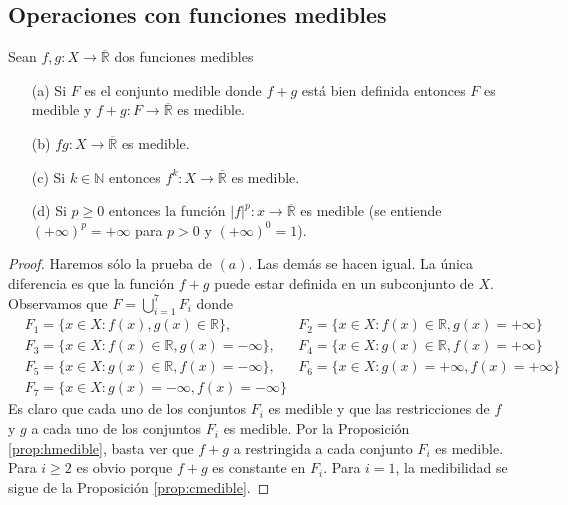 \subsection{Operaciones con funciones medibles}

\begin{prop}
    \label{prop:fmedibles}
    Sean $f,g: X \longrightarrow \overline{\mathbb{R}}$ dos funciones medibles
    \begin{enumerate}
        \item[(a)] Si $F$ es el conjunto medible donde $f+g$ está bien definida entonces $F$ es medible y $f+g: F \longrightarrow \overline{\mathbb{R}}$ es medible.
        \item[(b)] $fg: X \longrightarrow \overline{\mathbb{R}}$ es medible.
        \item[(c)] Si $k \in \mathbb{N}$ entonces $f^k: X \longrightarrow \overline{\mathbb{R}}$ es medible.
        \item[(d)] Si $p \ge 0$ entonces la función $|f|^p: x \longrightarrow \overline{\mathbb{R}}$ es medible (se entiende $(+\infty)^p = +\infty$ para $p > 0$ y $(+\infty)^0 = 1$).
    \end{enumerate}
\end{prop}

\begin{proof}
    Haremos sólo la prueba de $(a)$. Las demás se hacen igual. La única diferencia es que la función $f+g$ puede estar definida en un subconjunto de $X$. Observamos que $F = \bigcup_{i=1}^{7}{F_i}$ donde
    \begin{align*}
         & F_1 = \{ x \in X : f(x),g(x) \in \mathbb{R} \},          & F_2 = \{x \in X :f(x) \in \mathbb{R}, g(x) = +\infty \} \\
         & F_3 = \{x \in X :f(x) \in \mathbb{R}, g(x) = -\infty \}, & F_4 = \{x \in X :g(x) \in \mathbb{R}, f(x) = +\infty \} \\
         & F_5 = \{x \in X :g(x) \in \mathbb{R}, f(x) = -\infty \}, & F_6 = \{x \in X :g(x) = +\infty , f(x) = +\infty \}     \\
         & F_7 = \{x \in X :g(x) = -\infty , f(x) = -\infty \}
    \end{align*}
    Es claro que cada uno de los conjuntos $F_i$ es medible y que las restricciones de $f$ y $g$ a cada uno de los conjuntos $F_i$ es medible. Por la Proposición \ref{prop:hmedible}, basta ver que $f+g$ a restringida a cada conjunto $F_i$ es medible. Para $i \ge 2$ es obvio porque $f+g$ es constante en $F_i$. Para $i = 1$, la medibilidad se sigue de la Proposición \ref{prop:cmedible}.
\end{proof}

